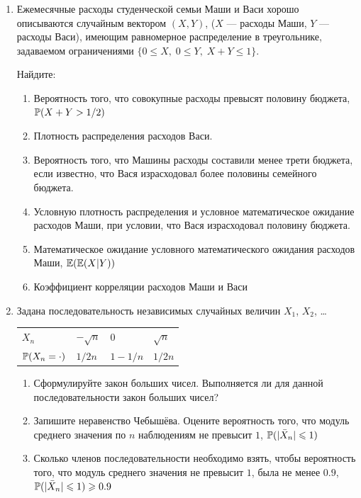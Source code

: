 \documentclass[12pt, a4paper]{article}\usepackage[]{graphicx}\usepackage[]{color}
\begin{document}
				\begin{enumerate}
					\item Ежемесячные расходы студенческой семьи Маши и Васи хорошо описываются случайным
					вектором $(X,Y)$, ($X$ — расходы Маши, $Y$ — расходы Васи), имеющим равномерное
					распределение в треугольнике, задаваемом ограничениями $\{0 \leq X, \; 0\leq Y, \; X+Y \leq 1 \}$.

					Найдите:

					\begin{enumerate}
						\item Вероятность того, что совокупные расходы превысят половину бюджета, $\P(X+Y>1/2)$
						\item Плотность распределения расходов Васи.
						\item Вероятность того, что Машины расходы составили менее трети бюджета, если
						известно, что Вася израсходовал более половины семейного бюджета.
						\item Условную плотность распределения и условное математическое ожидание расходов Маши, при условии, что Вася израсходовал половину бюджета.
						\item Математическое ожидание условного математического ожидания расходов Маши, $\E(\E(X|Y))$
						\item Коэффициент корреляции расходов Маши и Васи
					\end{enumerate}

					\item Задана последовательность независимых случайных величин $X_1$, $X_2$, \ldots

					\begin{tabular}{llll}
						\toprule
						$X_n$ & $-\sqrt{n}$ & $0$ & $\sqrt{n}$ \\
						$\P(X_n = \cdot)$ & $1/2n$ & $1-1/n$ & $1/2n$ \\
						\bottomrule
					\end{tabular}

					\begin{enumerate}
						\item Сформулируйте закон больших чисел. Выполняется ли для данной последовательности
						закон больших чисел?
						\item Запишите неравенство Чебышёва. Оцените вероятность того, что модуль среднего
						значения по $n$ наблюдениям не превысит $1$, $\P(|\bar X_n| \leq 1)$
						\item Сколько членов последовательности необходимо взять, чтобы вероятность того, что
						модуль среднего значения не превысит $1$, была не менее $0.9$, $\P(|\bar X_n| \leq 1)\geq 0.9$
					\end{enumerate}


\end{enumerate}
\end{document}
